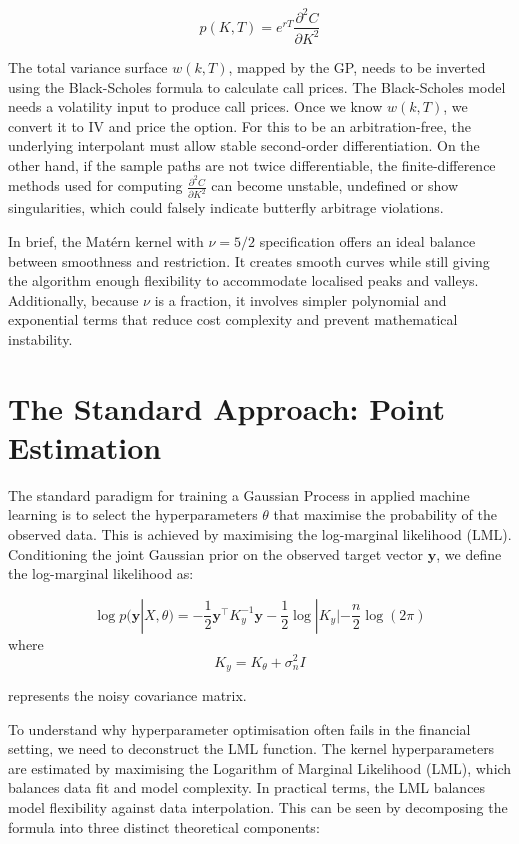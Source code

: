 \documentclass[12pt,oneside]{report}
\theoremstyle{definition}
\theoremstyle{remark}
\begin{document}
$$p(K,T) = e^{rT} \frac{\partial^2 C}{\partial K^2}$$

The total variance surface $w(k,T)$, mapped by the GP, needs to be inverted using the Black-Scholes formula to calculate call prices. The Black-Scholes model needs a volatility input to produce call prices. Once we know $w(k,T)$, we convert it to IV and price the option. For this to be an arbitration-free, the underlying interpolant must allow stable second-order differentiation. On the other hand, if the sample paths are not twice differentiable, the finite-difference methods used for computing $\frac{\partial^2 C}{\partial K^2}$ can become unstable, undefined or show singularities, which could falsely indicate butterfly arbitrage violations.

In brief, the Matérn kernel with $\nu = 5/2$ specification offers an ideal balance between smoothness and restriction. It creates smooth curves while still giving the algorithm enough flexibility to accommodate localised peaks and valleys. Additionally, because $\nu$ is a fraction, it involves simpler polynomial and exponential terms that reduce cost complexity and prevent mathematical instability.

\section{The Standard Approach: Point Estimation}
\label{sec:point_estimation_std_approach}
The standard paradigm for training a Gaussian Process in applied machine learning is to select the hyperparameters $\theta$ that maximise the probability of the observed data. This is achieved by maximising the log-marginal likelihood (LML). Conditioning the joint Gaussian prior on the observed target vector $\mathbf{y}$, we define the log-marginal likelihood as:

\begin{equation}
\log p(\mathbf{y} | X, \theta) = -\frac{1}{2}\mathbf{y}^\top K_y^{-1}\mathbf{y} - \frac{1}{2}\log|K_y| - \frac{n}{2}\log(2\pi)
\label{lml_conditioning}
\end{equation}
where
\begin{equation}
K_y = K_\theta + \sigma_n^2 I
\label{noise_covariance_matrix}
\end{equation}

represents the noisy covariance matrix. 


To understand why hyperparameter optimisation often fails in the financial setting, we need to deconstruct the LML function. The kernel hyperparameters are estimated by maximising the Logarithm of Marginal Likelihood (LML), which balances data fit and model complexity. In practical terms, the LML balances model flexibility against data interpolation. This can be seen by decomposing the formula into three distinct theoretical components:
\end{document}
